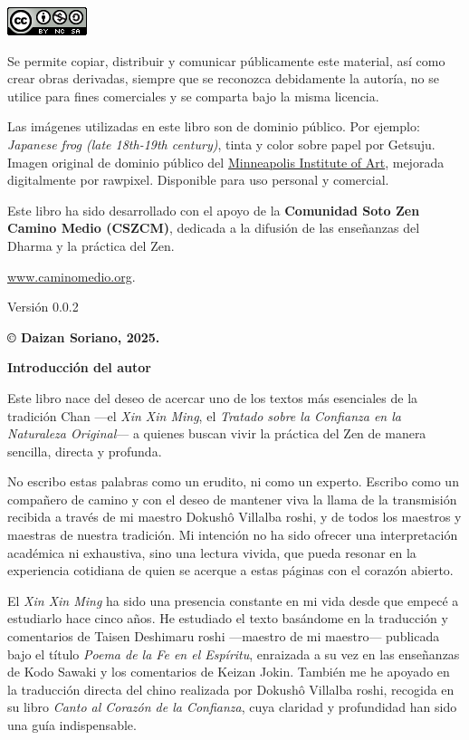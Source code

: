 \documentclass[
  a5paperpaper,
]{article}
\begin{document}
\includegraphics{../img/88x31.png}

Se permite copiar, distribuir y comunicar públicamente este material,
así como crear obras derivadas, siempre que se reconozca debidamente la
autoría, no se utilice para fines comerciales y se comparta bajo la
misma licencia.

Las imágenes utilizadas en este libro son de dominio público. Por
ejemplo: \emph{Japanese frog (late 18th-19th century)}, tinta y color
sobre papel por Getsuju. Imagen original de dominio público del
\href{https://collections.artsmia.org/}{Minneapolis Institute of Art},
mejorada digitalmente por rawpixel. Disponible para uso personal y
comercial.

Este libro ha sido desarrollado con el apoyo de la \textbf{Comunidad
Soto Zen Camino Medio (CSZCM)}, dedicada a la difusión de las enseñanzas
del Dharma y la práctica del Zen.

\href{https://www.caminomedio.org}{www.caminomedio.org}.

Versión 0.0.2

\textbf{© Daizan Soriano, 2025.}

\hfill\break

\newpage

\begin{center}\textbf{Introducción del autor}\end{center}

Este libro nace del deseo de acercar uno de los textos más esenciales de
la tradición Chan ---el \emph{Xin Xin Ming}, el \emph{Tratado sobre la
Confianza en la Naturaleza Original}--- a quienes buscan vivir la
práctica del Zen de manera sencilla, directa y profunda.

No escribo estas palabras como un erudito, ni como un experto. Escribo
como un compañero de camino y con el deseo de mantener viva la llama de
la transmisión recibida a través de mi maestro Dokushô Villalba roshi, y
de todos los maestros y maestras de nuestra tradición. Mi intención no
ha sido ofrecer una interpretación académica ni exhaustiva, sino una
lectura vivida, que pueda resonar en la experiencia cotidiana de quien
se acerque a estas páginas con el corazón abierto.

El \emph{Xin Xin Ming} ha sido una presencia constante en mi vida desde
que empecé a estudiarlo hace cinco años. He estudiado el texto basándome
en la traducción y comentarios de Taisen Deshimaru roshi ---maestro de
mi maestro--- publicada bajo el título \emph{Poema de la Fe en el
Espíritu}, enraizada a su vez en las enseñanzas de Kodo Sawaki y los
comentarios de Keizan Jokin. También me he apoyado en la traducción
directa del chino realizada por Dokushô Villalba roshi, recogida en su
libro \emph{Canto al Corazón de la Confianza}, cuya claridad y
profundidad han sido una guía indispensable.
\end{document}
